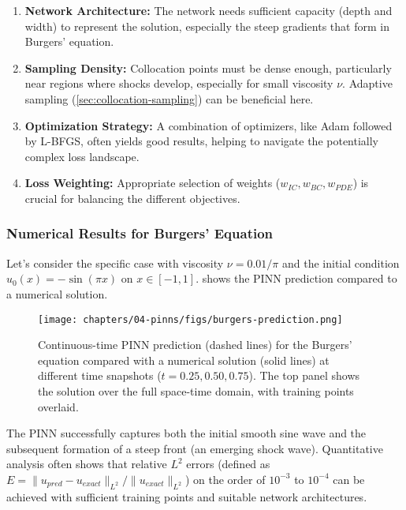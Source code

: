 \begin{enumerate}
    \item \textbf{Network Architecture:} The network needs sufficient capacity (depth and width) to represent the solution, especially the steep gradients that form in Burgers' equation.
    \item \textbf{Sampling Density:} Collocation points must be dense enough, particularly near regions where shocks develop, especially for small viscosity $\nu$. Adaptive sampling (\cref{sec:collocation-sampling}) can be beneficial here.
    \item \textbf{Optimization Strategy:} A combination of optimizers, like Adam followed by L-BFGS, often yields good results, helping to navigate the potentially complex loss landscape.
    \item \textbf{Loss Weighting:} Appropriate selection of weights ($w_{IC}, w_{BC}, w_{PDE}$) is crucial for balancing the different objectives.
\end{enumerate}

\subsubsection{Numerical Results for Burgers' Equation}

Let's consider the specific case with viscosity $\nu = 0.01/\pi$ and the initial condition $u_0(x) = -\sin(\pi x)$ on $x \in [-1, 1]$.  shows the PINN prediction compared to a numerical solution.

\begin{figure}[htbp]
    \centering
    \texttt{[image: chapters/04-pinns/figs/burgers-prediction.png]}
    \caption{Continuous-time PINN prediction (dashed lines) for the Burgers' equation compared with a numerical solution (solid lines) at different time snapshots ($t=0.25, 0.50, 0.75$). The top panel shows the solution over the full space-time domain, with training points overlaid.}
    \label{fig:burgers-prediction}
\end{figure}

The PINN successfully captures both the initial smooth sine wave and the subsequent formation of a steep front (an emerging shock wave). Quantitative analysis often shows that relative $L^2$ errors (defined as $E = \|u_{pred} - u_{exact}\|_{L^2} / \|u_{exact}\|_{L^2}$) on the order of $10^{-3}$ to $10^{-4}$ can be achieved with sufficient training points and suitable network architectures.

